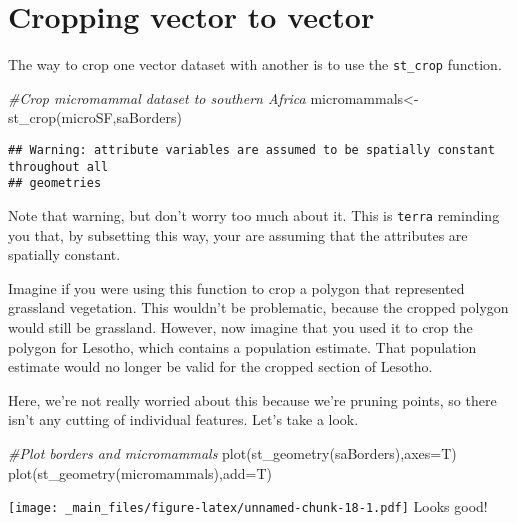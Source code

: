 \documentclass[
]{book}
\newenvironment{Shaded}{\begin{snugshade}}{\end{snugshade}}
\newcommand{\AttributeTok}[1]{\textcolor[rgb]{0.77,0.63,0.00}{#1}}
\newcommand{\CommentTok}[1]{\textcolor[rgb]{0.56,0.35,0.01}{\textit{#1}}}
\newcommand{\FunctionTok}[1]{\textcolor[rgb]{0.00,0.00,0.00}{#1}}
\newcommand{\NormalTok}[1]{#1}
\newcommand{\OtherTok}[1]{\textcolor[rgb]{0.56,0.35,0.01}{#1}}
\begin{document}
\hypertarget{cropping-vector-to-vector}{%
\section{Cropping vector to vector}\label{cropping-vector-to-vector}}

The way to crop one vector dataset with another is to use the \texttt{st\_crop} function.

\begin{Shaded}
\begin{Highlighting}[]
\CommentTok{\#Crop micromammal dataset to southern Africa}
\NormalTok{micromammals}\OtherTok{\textless{}{-}}\FunctionTok{st\_crop}\NormalTok{(microSF,saBorders)}
\end{Highlighting}
\end{Shaded}

\begin{verbatim}
## Warning: attribute variables are assumed to be spatially constant throughout all
## geometries
\end{verbatim}

Note that warning, but don't worry too much about it. This is \texttt{terra} reminding you that, by subsetting this way, your are assuming that the attributes are spatially constant.

Imagine if you were using this function to crop a polygon that represented grassland vegetation. This wouldn't be problematic, because the cropped polygon would still be grassland. However, now imagine that you used it to crop the polygon for Lesotho, which contains a population estimate. That population estimate would no longer be valid for the cropped section of Lesotho.

Here, we're not really worried about this because we're pruning points, so there isn't any cutting of individual features. Let's take a look.

\begin{Shaded}
\begin{Highlighting}[]
\CommentTok{\#Plot borders and micromammals}
\FunctionTok{plot}\NormalTok{(}\FunctionTok{st\_geometry}\NormalTok{(saBorders),}\AttributeTok{axes=}\NormalTok{T)}
\FunctionTok{plot}\NormalTok{(}\FunctionTok{st\_geometry}\NormalTok{(micromammals),}\AttributeTok{add=}\NormalTok{T)}
\end{Highlighting}
\end{Shaded}

\texttt{[image: \_main\_files/figure-latex/unnamed-chunk-18-1.pdf]}
Looks good!
\end{document}
